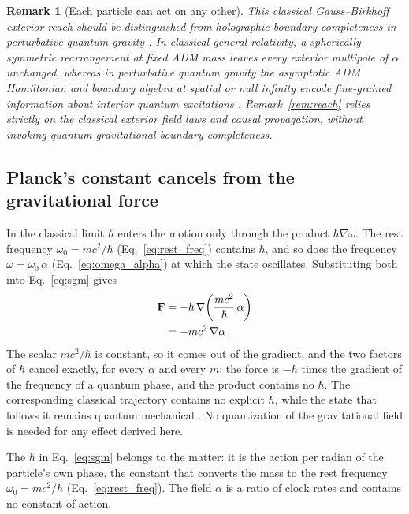 \documentclass[aps,prd,onecolumn,tightenlines,nofootinbib,notitlepage,11pt,floatfix]{revtex4-2}
\theoremstyle{indentedtheorem}
\newtheorem{remark}{Remark}
\begin{document}
\begin{remark}[Each particle can act on any other]
This classical Gauss--Birkhoff exterior reach should be distinguished from holographic boundary completeness in perturbative quantum gravity \citep{Bousso2002,Marolf2009,Laddha2021,Raju2022}. In classical general relativity, a spherically symmetric rearrangement at fixed ADM mass leaves every exterior multipole of $\alpha$ unchanged, whereas in perturbative quantum gravity the asymptotic ADM Hamiltonian and boundary algebra at spatial or null infinity encode fine-grained information about interior quantum excitations \citep{Marolf2009,Laddha2021,Raju2022}. Remark~\ref{rem:reach} relies strictly on the classical exterior field laws and causal propagation, without invoking quantum-gravitational boundary completeness.
\end{remark}

\subsection{Planck's constant cancels from the gravitational force}
\label{sec:hbar_cancels}

In the classical limit $\hbar$ enters the motion only through the product $\hbar\nabla\omega$. The rest frequency $\omega_0=mc^2/\hbar$ (Eq.~\eqref{eq:rest_freq}) contains $\hbar$, and so does the frequency $\omega=\omega_0 \, \alpha$ (Eq.~\eqref{eq:omega_alpha}) at which the state oscillates. Substituting both into Eq.~\eqref{eq:sgm} gives
\begin{align}
    \mathbf{F} &= -\hbar \, \nabla\!\left(\frac{m c^2}{\hbar} \, \alpha\right) \notag\\
    &= -m c^2 \, \nabla\alpha \, .
    \label{eq:hbar_cancels_identity}
\end{align}
The scalar $mc^2/\hbar$ is constant, so it comes out of the gradient, and the two factors of $\hbar$ cancel exactly, for every $\alpha$ and every $m$: the force is $-\hbar$ times the gradient of the frequency of a quantum phase, and the product contains no $\hbar$. The corresponding classical trajectory contains no explicit $\hbar$, while the state that follows it remains quantum mechanical \citep{Ehrenfest1927Bemerkung}. No quantization of the gravitational field is needed for any effect derived here.

The $\hbar$ in Eq.~\eqref{eq:sgm} belongs to the matter: it is the action per radian of the particle's own phase, the constant that converts the mass to the rest frequency $\omega_0=mc^2/\hbar$ (Eq.~\eqref{eq:rest_freq}). The field $\alpha$ is a ratio of clock rates and contains no constant of action.
\end{document}
